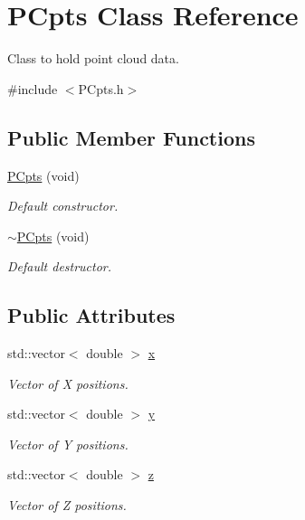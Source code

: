 \hypertarget{class_p_cpts}{}\section{P\+Cpts Class Reference}
\label{class_p_cpts}


Class to hold point cloud data.  




{\ttfamily \#include $<$P\+Cpts.\+h$>$}

\subsection*{Public Member Functions}
\begin{DoxyCompactItemize}
\item 
\hyperlink{class_p_cpts_a7ad6eb89fa6afac182580f3dfa09b1d7}{P\+Cpts} (void)
\begin{DoxyCompactList}\small\item\em Default constructor. \end{DoxyCompactList}\item 
\hyperlink{class_p_cpts_af538412d1ed43baa5fea3a78103e7734}{$\sim$\+P\+Cpts} (void)
\begin{DoxyCompactList}\small\item\em Default destructor. \end{DoxyCompactList}\end{DoxyCompactItemize}
\subsection*{Public Attributes}
\begin{DoxyCompactItemize}
\item 
std\+::vector$<$ double $>$ \hyperlink{class_p_cpts_a7459bb949ae0be96438f824af93e0e59}{x}
\begin{DoxyCompactList}\small\item\em Vector of X positions. \end{DoxyCompactList}\item 
std\+::vector$<$ double $>$ \hyperlink{class_p_cpts_aec4c018ef9941935b44ec08485153d2a}{y}
\begin{DoxyCompactList}\small\item\em Vector of Y positions. \end{DoxyCompactList}\item 
std\+::vector$<$ double $>$ \hyperlink{class_p_cpts_a2a4a9dc779fe86b5583c27bb19cf1d9f}{z}
\begin{DoxyCompactList}\small\item\em Vector of Z positions. \end{DoxyCompactList}\end{DoxyCompactItemize}


